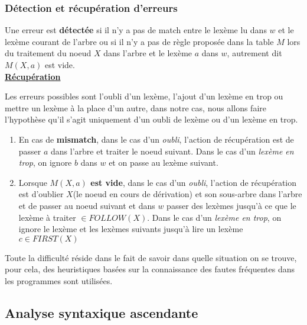 \documentclass{article}
\newcommand{\stitre}[1]{\noindent\textbf{\underline{#1}}}
\begin{document}
\subsubsection{Détection et récupération d'erreurs}

Une erreur est \textbf{détectée} si il n'y a pas de match entre le lexème lu dans $w$ et le lexème courant de l'arbre ou si il n'y a pas de règle proposée dans la table $M$ lors du 
traitement du noeud $X$ dans l'arbre et le lexème $a$ dans $w$, autrement dit $M(X,a)$ est vide. \\

\stitre{Récupération}

\noindent Les erreurs possibles sont l'oubli d'un lexème, l'ajout d'un lexème en trop ou mettre un lexème à la place d'un autre, dans notre cas, nous allons faire l'hypothèse qu'il 
s'agit uniquement d'un oubli de lexème ou d'un lexème en trop.

\begin{enumerate}
\item En cas de \textbf{mismatch}, dans le cas d'un \textit{oubli}, l'action de récupération est de passer $a$ dans l'arbre et traiter le noeud suivant. Dans le cas d'un 
\textit{lexème en trop}, on ignore $b$ dans $w$ et on passe au lexème suivant.
\item Lorsque\textbf{ $M(X,a)$ est vide}, dans le cas d'un \textit{oubli}, l'action de récupération est d'oublier $X$(le noeud en cours de dérivation) et son sous-arbre dans 
l'arbre et de passer au noeud suivant et dans $w$ passer des lexèmes jusqu'à ce que le lexème à traiter $\in FOLLOW(X)$. Dans le cas d'un \textit{lexème en trop}, on ignore le 
lexème et les lexèmes suivants jusqu'à lire un lexème $c \in FIRST(X)$
\end{enumerate}
Toute la difficulté réside dans le fait de savoir dans quelle situation on se trouve, pour cela, des heuristiques basées sur la connaissance des fautes fréquentes dans les programmes 
sont utilisées.

\subsection{Analyse syntaxique ascendante}
\end{document}
